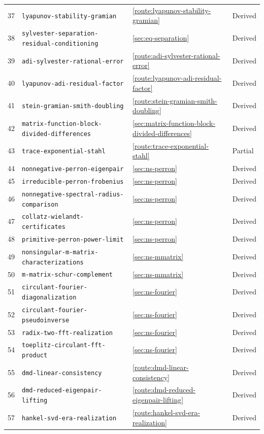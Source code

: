 \documentclass[11pt,a4paper]{article}
\DeclareRobustCommand{\code}[1]{{\footnotesize\urlstyle{tt}\nolinkurl{#1}}}
\begin{document}
\begin{longtable}{@{}r p{} l l@{}}
37 & \code{lyapunov-stability-gramian} & \ref{route:lyapunov-stability-gramian} & Derived \\
38 & \code{sylvester-separation-residual-conditioning} & \ref{sec:eq-separation} & Derived \\
39 & \code{adi-sylvester-rational-error} & \ref{route:adi-sylvester-rational-error} & Derived \\
40 & \code{lyapunov-adi-residual-factor} & \ref{route:lyapunov-adi-residual-factor} & Derived \\
41 & \code{stein-gramian-smith-doubling} & \ref{route:stein-gramian-smith-doubling} & Derived \\
42 & \code{matrix-function-block-divided-differences} & \ref{sec:matrix-function-block-divided-differences} & Derived \\
43 & \code{trace-exponential-stahl} & \ref{route:trace-exponential-stahl} & Partial \\
44 & \code{nonnegative-perron-eigenpair} & \ref{sec:ns-perron} & Derived \\
45 & \code{irreducible-perron-frobenius} & \ref{sec:ns-perron} & Derived \\
46 & \code{nonnegative-spectral-radius-comparison} & \ref{sec:ns-perron} & Derived \\
47 & \code{collatz-wielandt-certificates} & \ref{sec:ns-perron} & Derived \\
48 & \code{primitive-perron-power-limit} & \ref{sec:ns-perron} & Derived \\
49 & \code{nonsingular-m-matrix-characterizations} & \ref{sec:ns-mmatrix} & Derived \\
50 & \code{m-matrix-schur-complement} & \ref{sec:ns-mmatrix} & Derived \\
51 & \code{circulant-fourier-diagonalization} & \ref{sec:ns-fourier} & Derived \\
52 & \code{circulant-fourier-pseudoinverse} & \ref{sec:ns-fourier} & Derived \\
53 & \code{radix-two-fft-realization} & \ref{sec:ns-fourier} & Derived \\
54 & \code{toeplitz-circulant-fft-product} & \ref{sec:ns-fourier} & Derived \\
55 & \code{dmd-linear-consistency} & \ref{route:dmd-linear-consistency} & Derived \\
56 & \code{dmd-reduced-eigenpair-lifting} & \ref{route:dmd-reduced-eigenpair-lifting} & Derived \\
57 & \code{hankel-svd-era-realization} & \ref{route:hankel-svd-era-realization} & Derived \\

\end{longtable}
\end{document}
